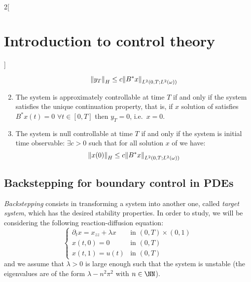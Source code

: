 \documentclass[../../../main_math.tex]{subfiles}
\begin{document}
\begin{multicols}{2}[\section{Introduction to control theory}]
\begin{theorem}
\begin{enumerate}
            $$
              \norm{y_T}_{H}\leq c\norm{B^*x}_{L^2(0,T;L^2(\omega))}
            $$
      \item The system  is approximately controllable at time $T$ if and only if the system  satisfies the unique continuation property, that is, if $x$ solution of  satisfies $B^*x(t)=0$ $\forall t\in [0,T]$ then $y_T=0$, i.e.\ $x=0$.
      \item The system  is null controllable at time $T$ if and only if the system  is initial time observable: $\exists c>0$ such that for all solution $x$ of  we have:
            $$
              \norm{x(0)}_{H}\leq c\norm{B^*x}_{L^2(0,T;L^2(\omega))}
            $$
    \end{enumerate}
  \end{theorem}
  \subsection{Backstepping for boundary control in PDEs}
  \emph{Backstepping} consists in transforming a system into another one, called \emph{target system}, which has the desired stability properties. In order to study, we will be considering the following reaction-diffusion equation:
  \begin{equation}\label{ICT:reaction_diffusion}
    \begin{cases}
      \partial_t x=x_{zz}+\lambda x & \text{in } (0,T)\times (0,1) \\
      x(t,0)=0                      & \text{in } (0,T)             \\
      x(t,1)=u(t)                   & \text{in } (0,T)
    \end{cases}
  \end{equation}
  and we assume that $\lambda>0$ is large enough such that the system is unstable (the eigenvalues are of the form $\lambda-n^2\pi^2$ with $n\in\NN$).


\end{multicols}
\end{document}
